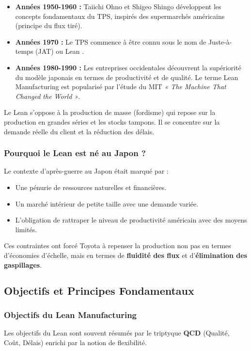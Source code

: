 \documentclass[a4paper,12pt]{article}
\begin{document}
\begin{itemize}
    \item \textbf{Années 1950-1960 :} Taiichi Ohno et Shigeo Shingo développent les concepts fondamentaux du TPS, inspirés des supermarchés américains (principe du flux tiré).
    \item \textbf{Années 1970 :} Le TPS commence à être connu sous le nom de \og Juste-à-temps \fg{} (JAT) ou \og Lean \fg.
    \item \textbf{Années 1980-1990 :} Les entreprises occidentales découvrent la supériorité du modèle japonais en termes de productivité et de qualité. Le terme \og Lean Manufacturing \fg{} est popularisé par l'étude du MIT \textit{« The Machine That Changed the World »}.
\end{itemize}

Le Lean s'oppose à la production de masse (fordisme) qui repose sur la production en grandes séries et les stocks tampons. Il se concentre sur la demande réelle du client et la réduction des délais.

\subsubsection{Pourquoi le Lean est né au Japon ?}

Le contexte d'après-guerre au Japon était marqué par :
\begin{itemize}
    \item Une pénurie de ressources naturelles et financières.
    \item Un marché intérieur de petite taille avec une demande variée.
    \item L'obligation de rattraper le niveau de productivité américain avec des moyens limités.
\end{itemize}
Ces contraintes ont forcé Toyota à repenser la production non pas en termes d'économies d'échelle, mais en termes de \textbf{fluidité des flux} et d'\textbf{élimination des gaspillages}.

\subsection{Objectifs et Principes Fondamentaux}

\subsubsection{Objectifs du Lean Manufacturing}

Les objectifs du Lean sont souvent résumés par le triptyque \textbf{QCD} (Qualité, Coût, Délais) enrichi par la notion de flexibilité.
\end{document}
